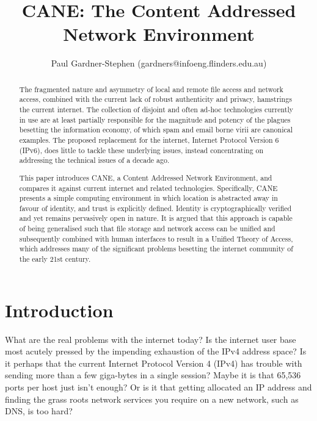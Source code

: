\documentclass[british,english]{article}
\begin{document}

\title{CANE: The Content Addressed Network Environment}


\author{Paul Gardner-Stephen (gardners@infoeng.flinders.edu.au)}

\maketitle
\begin{abstract}
The fragmented nature and asymmetry of local and remote file access
and network access, combined with the current lack of robust authenticity
and privacy, hamstrings the current internet. The collection of disjoint
and often ad-hoc technologies currently in use are at least partially
responsible for the magnitude and potency of the plagues besetting
the information economy, of which spam and email borne virii are canonical
examples. The proposed replacement for the internet, Internet Protocol
Version 6 (IPv6\citep{ipv6_rfc}), does little to tackle these underlying
issues, instead concentrating on addressing the technical issues of
a decade ago. 

This paper introduces CANE, a Content Addressed Network Environment,
and compares it against current internet and related technologies.
Specifically, CANE presents a simple computing environment in which
location is abstracted away in favour of identity, and trust is explicitly
defined. Identity is cryptographically verified and yet remains pervasively
open in nature. It is argued that this approach is capable of being
generalised such that file storage and network access can be unified
and subsequently combined with human interfaces to result in a Unified
Theory of Access, which addresses many of the significant problems
besetting the internet community of the early 21st century. 
\end{abstract}

\section{Introduction}

What are the real problems with the internet today? Is the internet
user base most acutely pressed by the impending exhaustion of the
IPv4\citep{ipv4_rfc} address space? Is it perhaps that the current
Internet Protocol Version 4 (IPv4) has trouble with sending more than
a few giga-bytes in a single session? Maybe it is that 65,536 ports
per host just isn't enough? Or is it that getting allocated an IP
address and finding the grass roots network services you require on
a new network, such as DNS, is too hard?
\end{document}
